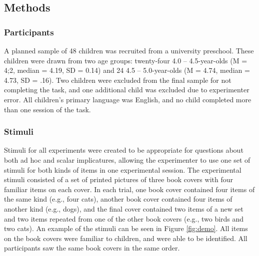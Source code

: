 \documentclass[man]{apa2}
\begin{document}

\subsection{Methods}

\subsubsection{Participants} A planned sample of 48 children was recruited from a university preschool. These children were drawn from two age groups: twenty-four 4.0 -- 4.5-year-olds (M = 4;2, median = 4.19, SD = 0.14) and 24 4.5 -- 5.0-year-olds (M = 4.74, median = 4.73, SD = .16). Two children were excluded from the final sample for not completing the task, and one additional child was excluded due to experimenter error. All children's primary language was English, and no child completed more than one session of the task.  

\subsubsection{Stimuli}
Stimuli for all experiments were created to be appropriate for questions about both ad hoc and scalar implicatures, allowing the experimenter to use one set of stimuli for both kinds of items in one experimental session. The experimental stimuli consisted of a set of printed pictures of three book covers with four familiar items on each cover. In each trial, one book cover contained four items of the same kind (e.g., four cats), another book cover contained four items of another kind (e.g., dogs), and the final cover contained two items of a new set and two items repeated from one of the other book covers (e.g., two birds and two cats). An example of the stimuli can be seen in Figure \ref{fig:demo}. All items on the book covers were familiar to children, and were able to be identified. All participants saw the same book covers in the same order. 
\end{document}
